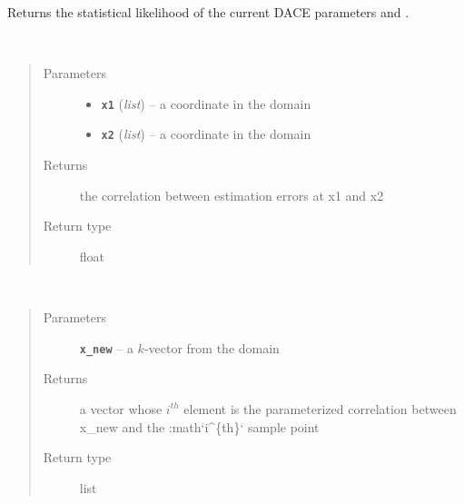 \documentclass[letterpaper,10pt,english]{sphinxmanual}
\begin{document}
\begin{fulllineitems}
\begin{fulllineitems}
Returns the statistical likelihood of the current DACE parameters  and .

\end{fulllineitems}


\begin{fulllineitems}
\label{index:smbo.models.dace.corr}~\begin{quote}\begin{description}
\item[{Parameters}] \leavevmode\begin{itemize}
\item {} 
\textbf{\texttt{x1}} (\emph{list}) -- a coordinate in the domain

\item {} 
\textbf{\texttt{x2}} (\emph{list}) -- a coordinate in the domain

\end{itemize}

\item[{Returns}] \leavevmode
the correlation between estimation errors at x1 and x2

\item[{Return type}] \leavevmode
float

\end{description}\end{quote}

\end{fulllineitems}


\begin{fulllineitems}
\label{index:smbo.models.dace.corr_vector}~\begin{quote}\begin{description}
\item[{Parameters}] \leavevmode
\textbf{\texttt{x\_new}} -- a \(k\)-vector from the domain

\item[{Returns}] \leavevmode
a vector whose \(i^{th}\) element is the parameterized correlation between x\_new and the :math{}`i\textasciicircum{}\{th\}{}` sample point

\item[{Return type}] \leavevmode
list


\end{description}
\end{quote}
\end{fulllineitems}
\end{fulllineitems}
\end{document}

